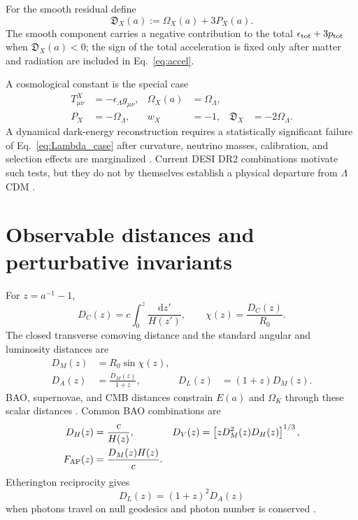 \documentclass[
  aps,
  prd,
  reprint,
  superscriptaddress,
  nofootinbib,
  floatfix,
  longbibliography
]{revtex4-2}
\theoremstyle{plain}
\theoremstyle{definition}
\theoremstyle{remark}
\newcommand{\dd}{\mathrm d}
\newcommand{\Dacc}{\mathfrak D_X}
\begin{document}
For the smooth residual define
\begin{equation}
\Dacc(a):=\Omega_X(a)+3P_X(a).
\label{eq:DX}
\end{equation}
The smooth component carries a negative contribution to the total
$\epsilon_{\rm tot}+3p_{\rm tot}$ when $\Dacc(a)<0$; the sign of
the total acceleration is fixed only after matter and radiation are included in
Eq.~\eqref{eq:accel}.

A cosmological constant is the special case
\begin{align}
T^X_{\mu\nu}&=-\epsilon_\Lambda g_{\mu\nu},
&
\Omega_X(a)&=\Omega_\Lambda,
\nonumber\\
P_X&=-\Omega_\Lambda,
&
w_X&=-1,
&
\Dacc&=-2\Omega_\Lambda .
\label{eq:Lambda_case}
\end{align}
A dynamical dark-energy reconstruction requires a statistically significant
failure of Eq.~\eqref{eq:Lambda_case} after curvature, neutrino masses,
calibration, and selection effects are marginalized
\cite{Linder2003,DESIDR2DE2025}.  Current DESI DR2 combinations motivate such
tests, but they do not by themselves establish a physical departure from
$\Lambda$CDM \cite{DESIDR2BAO2025,DESIDR2DE2025}.

\section{Observable distances and perturbative invariants}

For $z=a^{-1}-1$,
\begin{equation}
D_C(z)=c\int_0^z\frac{\dd z'}{H(z')},\qquad
\chi(z)=\frac{D_C(z)}{R_0}.
\label{eq:DC_chi}
\end{equation}
The closed transverse comoving distance and the standard angular and luminosity
distances are
\begin{align}
D_M(z)&=R_0\sin\chi(z),
\nonumber\\
D_A(z)&=\frac{D_M(z)}{1+z},
&
D_L(z)&=(1+z)D_M(z).
\label{eq:closed_distances}
\end{align}
BAO, supernovae, and CMB distances constrain $E(a)$ and $\Omega_K$ through
these scalar distances
\cite{Planck2018VI,DESIDR2BAO2025,DESIDR2Lya2025,
PantheonPlus2022,PantheonPlusData2022}.  Common BAO
combinations are
\begin{align}
D_H(z)&=\frac{c}{H(z)},
&
D_V(z)&=\left[zD_M^2(z)D_H(z)\right]^{1/3},
\nonumber\\
F_{\rm AP}(z)&=\frac{D_M(z)H(z)}{c}.
\label{eq:bao_invariants}
\end{align}
Etherington reciprocity gives
\begin{equation}
D_L(z)=(1+z)^2D_A(z)
\label{eq:etherington}
\end{equation}
when photons travel on null geodesics and photon number is conserved
\cite{Etherington1933}.
\end{document}
